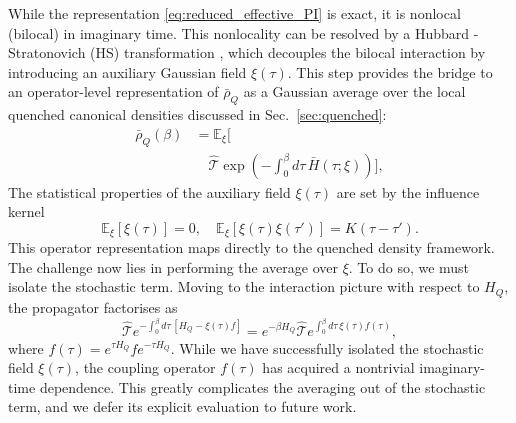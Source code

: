 \documentclass[aps,prl,twocolumn,superscriptaddress,showpacs,floatfix]{revtex4-2}
\begin{document}
While the representation \eqref{eq:reduced_effective_PI} is exact, it is nonlocal (bilocal) in imaginary time. This nonlocality can be resolved by a Hubbard - Stratonovich (HS) transformation \cite{hubbardCalculationPartitionFunctions1959a, stratonovich1957QDistro}, which decouples the bilocal interaction by introducing an auxiliary Gaussian field $\xi(\tau)$. This step provides the bridge to an operator-level representation of $\bar{\rho}_Q$ as a Gaussian average over the local quenched canonical densities discussed in Sec.~\ref{sec:quenched}:
\begin{equation}
\begin{split}
    \bar\rho_Q(\beta) 
    &= 
    \mathbb E_\xi\bigg[ \\
    &\quad \hat{\mathcal{T}}\exp\!\left(-\int_0^\beta d\tau\,\bar{H}(\tau;\xi)\right) \bigg],
\end{split}
    \label{eq:bar_rho_as_quenched_average}
\end{equation}
The statistical properties of the auxiliary field $\xi(\tau)$ are set by the influence kernel \cite{mccaulPartitionfreeApproachOpen2017c,mccaulDrivingSpinbosonModels2018a,mccaulHowWinFriends2021b}
\begin{equation}
    \mathbb{E}_\xi[\xi(\tau)] = 0, \quad \mathbb{E}_\xi[\xi(\tau)\xi(\tau')] = K(\tau-\tau').
    \label{eq:noise_statistics}
\end{equation}
This operator representation maps directly to the quenched density framework. The challenge now lies in performing the average over $\xi$. To do so, we must isolate the stochastic term. Moving to the interaction picture with respect to $H_Q$, the propagator factorises as
\begin{equation}
    \hat{\mathcal{T}}e^{-\int_0^\beta d\tau\,[H_Q - \xi(\tau)f]} = e^{-\beta H_Q} \hat{\mathcal{T}}e^{\int_0^\beta d\tau\, \xi(\tau) f(\tau)},
    \label{eq:interaction_picture_split}
\end{equation}
where $f(\tau) = e^{\tau H_Q} f e^{-\tau H_Q}$. While we have successfully isolated the stochastic field $\xi(\tau)$, the coupling operator $f(\tau)$ has acquired a nontrivial imaginary-time dependence. This greatly complicates the averaging out of the stochastic term, and we defer its explicit evaluation to future work. 
\end{document}
